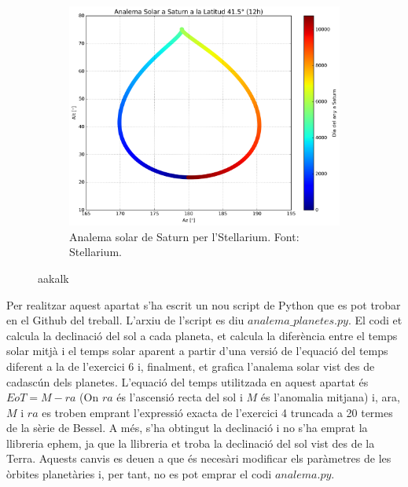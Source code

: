 \documentclass[a4paper, 11pt]{article}
\begin{document}
\begin{figure}[h!]
\begin{subfigure}{0.45\textwidth}
        \includegraphics[width=\textwidth]{images/analema_Saturn.png}
        \caption{Analema solar de Saturn per l'Stellarium. Font: Stellarium.}
    \end{subfigure}
\caption{aakalk}
\label{fig:planetes}
\end{figure}
\vspace{2mm}

\noindent Per realitzar aquest apartat s'ha escrit un nou script de Python que es pot trobar en el Github del treball. L'arxiu de l'script es diu $analema\_planetes.py$. El codi et calcula la declinació del sol a cada planeta, et calcula la diferència entre el temps solar mitjà i el temps solar aparent a partir d'una versió de l'equació del temps diferent a la de l'exercici 6 i, finalment, et grafica l'analema solar vist des de cadascún dels planetes. L'equació del temps utilitzada en aquest apartat és $EoT = M - ra$ (On $ra$ és l'ascensió recta del sol i $M$ és l'anomalia mitjana) i, ara, $M$ i $ra$ es troben emprant l'expressió exacta de l'exercici 4 truncada a 20 termes de la sèrie de Bessel. A més, s'ha obtingut la declinació i no s'ha emprat la llibreria ephem, ja que la llibreria et troba la declinació del sol vist des de la Terra. Aquests canvis es deuen a que és necesàri modificar els paràmetres de les òrbites planetàries i, per tant, no es pot emprar el codi $analema.py$.

\vspace{2mm}
\end{document}

